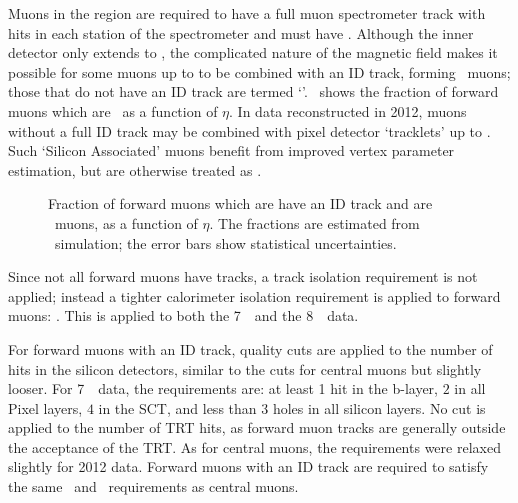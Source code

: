 Muons in the region  are required to have a full muon
spectrometer track with hits in each station of the spectrometer and must have
. Although the
inner detector only extends to , the complicated nature of the
magnetic field makes it possible for some muons up to  to be
combined with an ID track, forming \combined\ muons; those that do not have an
ID track are termed `\standAlone'.~ shows the fraction
of forward muons which are \combined\ as a function of $\eta$. In data
reconstructed in 2012, muons without a
full ID track may be combined with pixel detector `tracklets' up to
. Such `Silicon Associated' muons benefit from improved vertex
parameter estimation, but are otherwise treated as \standAlone. 

\begin{figure}[h]
\centering
\caption[Fraction of forward muons which are \combined\ muons as a function of
$\eta$]{Fraction of forward
muons which are have an ID track and are \combined\ muons, as a function of
$\eta$. The fractions are estimated from \mc\ simulation; the error bars show
statistical uncertainties.}
\label{fig:fwdmu-frac-combined}
\end{figure}

Since not all forward muons
have tracks, a track isolation requirement is not applied; instead a tighter calorimeter isolation
requirement is applied to forward muons: . This is applied
to both the 7~\tev\ and the 8~\tev\ data.

For forward muons with an ID track, quality
cuts are applied to the number of hits in the silicon detectors, similar to the
cuts for central muons but slightly looser. For 7~\tev\ data,
the requirements are: at least 1 hit in the b-layer, $2$ in all Pixel layers,
$4$ in the SCT, and less than 3 holes 
in all silicon layers. No cut is applied to the number of TRT hits, as forward
muon tracks are generally outside the acceptance of the TRT. As for
central muons, the requirements were relaxed slightly for 2012 data.
Forward muons with an ID track are required to satisfy the same
\zzero\ and \dzerosig\ requirements as central muons.

